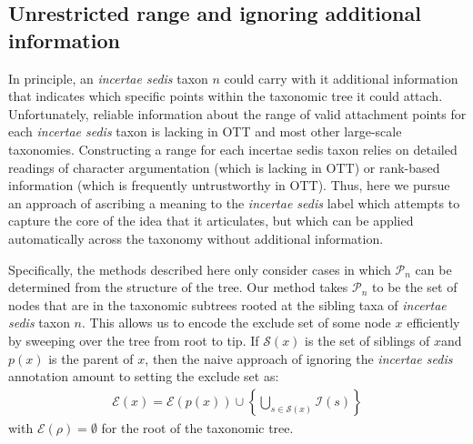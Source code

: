 \documentclass[english]{article}
\begin{document}


\subsection{Unrestricted range and ignoring additional information}
In principle, an \emph{incertae sedis} taxon $n$ could carry with it additional
    information that indicates which specific points within the taxonomic tree
    it could attach.
Unfortunately, reliable information about the range of valid attachment points
for each \emph{incertae sedis} taxon is lacking in OTT and most other large-scale
taxonomies.
Constructing a range for each incertae sedis taxon relies on detailed
readings of character argumentation (which is lacking in OTT) or rank-based
information (which is frequently untrustworthy in OTT). Thus, here we pursue
an approach of ascribing a meaning to the \emph{incertae sedis} label which
attempts to capture the core of the idea that it articulates, but which can be
applied automatically across the taxonomy without additional information.


Specifically, the methods described here only consider cases in which 
    $\mathcal{P}_n$ can be determined from the structure of the tree.
Our method takes $\mathcal{P}_n$ to be the set of nodes that
    are in the taxonomic subtrees rooted at the sibling taxa of \emph{incertae sedis} taxon $n$.
This allows us to encode the exclude set of some node $x$ efficiently by sweeping
    over the tree from root to tip.
If $\mathcal{S}(x)$ is the set of siblings of $x$and $p(x)$ is the parent of $x$, then
the naive approach of ignoring the \emph{incertae sedis}  annotation amount to setting
    the exclude set as:
\begin{align}
    \mathcal{E}(x) = \mathcal{E}(p(x)) \cup \left\{ \bigcup_{s\in \mathcal{S}(x)} \mathcal{I}(s) \right\}
    \label{eq:exsetformonea-traditional}
\end{align}
with $\mathcal{E}(\rho) = \emptyset$ for the root of the taxonomic tree.
\end{document}
